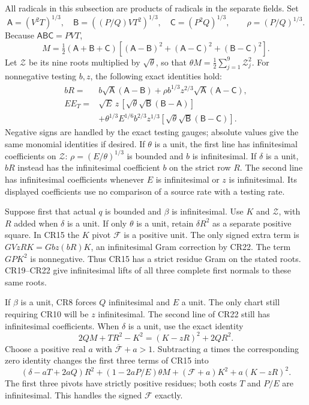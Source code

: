 All radicals in this subsection are products of radicals in the
separate fields. Set
\[
 \mathsf A=(V^2T)^{1/3},\quad
 \mathsf B=((P/Q)VT^2)^{1/3},\quad
 \mathsf C=(P^2Q)^{1/3},\qquad \rho=(P/Q)^{1/3}.
\]
Because $\mathsf A\mathsf B\mathsf C=PVT$,
\[
 M=\tfrac12(\mathsf A+\mathsf B+\mathsf C)
 [ (\mathsf A-\mathsf B)^2+(\mathsf A-\mathsf C)^2
                         +(\mathsf B-\mathsf C)^2].
 \tag{CR21}
\]
Let $\mathcal Z$ be its nine roots multiplied by $\sqrt\theta$,
so that $\theta M=\frac12\sum_{j=1}^9\mathcal Z_j^2$.
For nonnegative testing $b,z$, the following exact identities hold:
\[
\begin{aligned}
 bR={}&b\sqrt{\mathsf A}(\mathsf A-\mathsf B)
       +\rho b^{1/3}z^{2/3}\sqrt{\mathsf A}(\mathsf A-\mathsf C),\\
 E E_T={}&\sqrt E\,z\,[\sqrt\theta\sqrt{\mathsf B}
                                      (\mathsf B-\mathsf A)]\\
 &+\theta^{1/3}E^{1/6}b^{2/3}z^{1/3}
       [\sqrt\theta\sqrt{\mathsf B}(\mathsf B-\mathsf C)].
\end{aligned}\tag{CR22}
\]
Negative signs are handled by the exact testing gauges; absolute
values give the same monomial identities if desired. If $\theta$
is a unit, the first line has infinitesimal coefficients on
$\mathcal Z$: $\rho=(E/\theta)^{1/3}$ is bounded and $b$ is
infinitesimal. If $\delta$ is a unit, $bR$ instead has the
infinitesimal coefficient $b$ on the strict row $R$. The second
line has infinitesimal coefficients whenever $E$ is infinitesimal
or $z$ is infinitesimal. Its displayed coefficients use no
comparison of a source rate with a testing rate.

Suppose first that actual $q$ is bounded and $\beta$ is
infinitesimal. Use $K$ and $\mathcal Z$, with $R$ added when
$\delta$ is a unit. If only $\theta$ is a unit, retain
$\delta R^2$ as a separate positive square. In CR15 the $K$
pivot $\mathcal F$ is a positive unit. The only signed extra
term is
$GVzRK=Gbz(bR)K$, an infinitesimal Gram correction by CR22.
The term $GPK^2$ is nonnegative. Thus CR15 has a strict residue
Gram on the stated roots. CR19--CR22 give infinitesimal lifts of
all three complete first normals to these same roots.

If $\beta$ is a unit, CR8 forces $Q$ infinitesimal and $E$ a
unit. The only chart still requiring CR10 will be $z$ infinitesimal.
The second line of CR22 still has infinitesimal coefficients.
When $\delta$ is a unit, use the exact identity
\[
 2QM+TR^2-K^2=(K-zR)^2+2QR^2.
 \tag{CR23}
\]
Choose a positive real $a$ with $\overline{\mathcal F}+a>1$.
Subtracting $a$ times the corresponding zero identity changes the
first three terms of CR15 into
\[
 (\delta-aT+2aQ)R^2+(1-2aP/E)\theta M
       +(\mathcal F+a)K^2+a(K-zR)^2.
 \tag{CR24}
\]
The first three pivots have strictly positive residues; both costs
$T$ and $P/E$ are infinitesimal. This handles the signed
$\mathcal F$ exactly.

